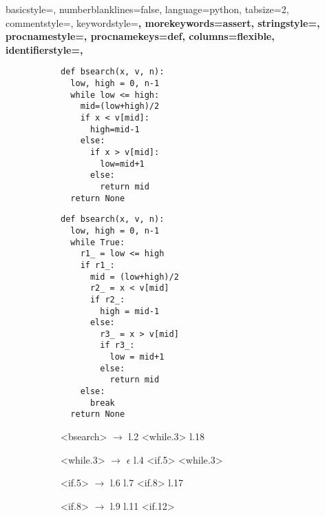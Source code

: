 {
    basicstyle=\footnotesize\ttfamily,
    numberblanklines=false,
    language=python,
    tabsize=2,
    commentstyle=\color{gray},
    keywordstyle=\bfseries\color{eclipsePurple},
    morekeywords={assert},
    stringstyle=\color{eclipseBlue},
    procnamestyle=\bfseries\color{black},
    procnamekeys={def},
    columns=flexible,
    identifierstyle=,
}
\begin{figure} %
\begin{subfigure}[h]{0.24\textwidth} %
\begin{lstlisting}[style=Python, escapechar=|,numbersep=2pt]
def bsearch(x, v, n):
  low, high = 0, n-1
  while low <= high:
    mid=(low+high)/2
    if x < v[mid]:
      high=mid-1
    else:
      if x > v[mid]:
        low=mid+1
      else:
        return mid
  return None
\end{lstlisting}
\vspace{60pt}
\end{subfigure}
\begin{subfigure}[h]{0.29\textwidth} %
\begin{lstlisting}[style=Python, escapechar=|,numbersep=2pt]
def bsearch(x, v, n):
  low, high = 0, n-1
  while True:
    r1_ = low <= high
    if r1_:
      mid = (low+high)/2
      r2_ = x < v[mid]
      if r2_:
        high = mid-1
      else:
        r3_ = x > v[mid]
        if r3_:
          low = mid+1
        else:
          return mid
    else:
      break
  return None
\end{lstlisting}
\end{subfigure}
\begin{subfigure}[h]{0.28\textwidth}   %
\begin{grammar}%
  <bsearch> $\rightarrow$ l.2 <while.3> l.18

  <while.3> $\rightarrow$ $\epsilon$
   \alt l.4 <if.5> <while.3>

  <if.5>    $\rightarrow$ l.6 l.7 <if.8>
   \alt l.17

  <if.8> $\rightarrow$ l.9
   \alt l.11 <if.12>


\end{grammar}
\end{subfigure}
\end{figure}
